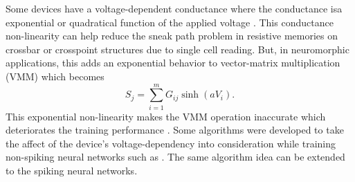 \documentclass[english]{article}
\renewcommand{\cite}{\citep}
\begin{document}
Some devices have a voltage-dependent conductance where the conductance isa  exponential or quadratical function of the applied voltage \cite{Fouda_etal18_modeanal}. 
This conductance non-linearity can help reduce the sneak path problem in resistive memories on crossbar or crosspoint structures \cite{fouda2019resistive} due to single cell reading. 
But, in neuromorphic applications, this adds an exponential behavior to vector-matrix multiplication (VMM) which becomes
\begin{equation}
    S_j=\sum_{i=1}^m G_{ij} \sinh(a V_i). 
\end{equation}
\noindent This exponential non-linearity makes the VMM operation inaccurate which deteriorates the training performance \cite{kim2018deep}. Some algorithms were developed to take the affect of the device's voltage-dependency into consideration while training non-spiking neural networks such as \cite{kim2018deep}. The same algorithm idea can be extended to the spiking neural networks.         
\end{document}
